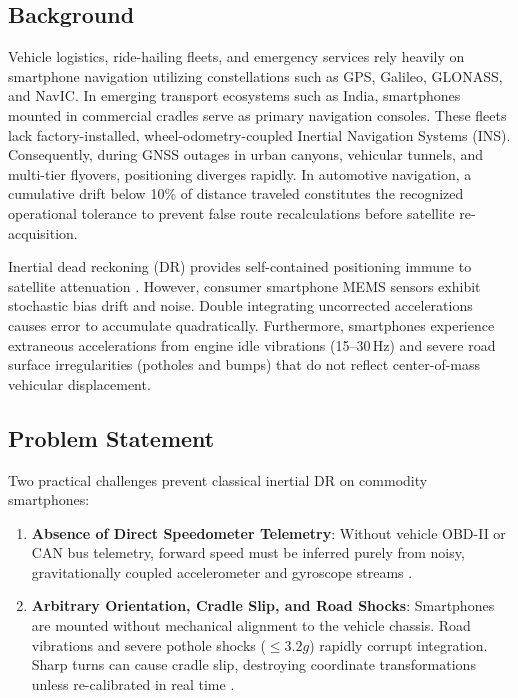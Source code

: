 \documentclass[conference]{IEEEtran}
\begin{document}
\subsection{Background}
Vehicle logistics, ride-hailing fleets, and emergency services rely heavily on smartphone navigation utilizing constellations such as GPS, Galileo, GLONASS, and NavIC. In emerging transport ecosystems such as India, smartphones mounted in commercial cradles serve as primary navigation consoles. These fleets lack factory-installed, wheel-odometry-coupled Inertial Navigation Systems (INS). Consequently, during GNSS outages in urban canyons, vehicular tunnels, and multi-tier flyovers, positioning diverges rapidly. In automotive navigation, a cumulative drift below 10\% of distance traveled constitutes the recognized operational tolerance to prevent false route recalculations before satellite re-acquisition.

Inertial dead reckoning (DR) provides self-contained positioning immune to satellite attenuation \cite{brossard2020, lawal2024}. However, consumer smartphone MEMS sensors exhibit stochastic bias drift and noise. Double integrating uncorrected accelerations causes error to accumulate quadratically. Furthermore, smartphones experience extraneous accelerations from engine idle vibrations (15--30\,Hz) and severe road surface irregularities (potholes and bumps) that do not reflect center-of-mass vehicular displacement.

\subsection{Problem Statement}
Two practical challenges prevent classical inertial DR on commodity smartphones:
\begin{enumerate}
\item \textbf{Absence of Direct Speedometer Telemetry}: Without vehicle OBD-II or CAN bus telemetry, forward speed must be inferred purely from noisy, gravitationally coupled accelerometer and gyroscope streams \cite{brossard2020, qian2025}.
\item \textbf{Arbitrary Orientation, Cradle Slip, and Road Shocks}: Smartphones are mounted without mechanical alignment to the vehicle chassis. Road vibrations and severe pothole shocks ($\le 3.2g$) rapidly corrupt integration. Sharp turns can cause cradle slip, destroying coordinate transformations unless re-calibrated in real time \cite{matos2025}.
\end{enumerate}
\end{document}
